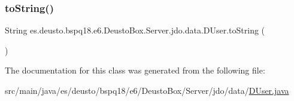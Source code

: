 \subsubsection{\texorpdfstring{to\+String()}{toString()}}
{\footnotesize\ttfamily String es.\+deusto.\+bspq18.\+e6.\+Deusto\+Box.\+Server.\+jdo.\+data.\+D\+User.\+to\+String (\begin{DoxyParamCaption}{ }\end{DoxyParamCaption})}



The documentation for this class was generated from the following file\+:\begin{DoxyCompactItemize}
\item 
src/main/java/es/deusto/bspq18/e6/\+Deusto\+Box/\+Server/jdo/data/\mbox{\hyperlink{_d_user_8java}{D\+User.\+java}}\end{DoxyCompactItemize}
